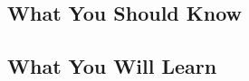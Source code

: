 \subsection{What You Should Know}

\begin{frame}{\myframetitle{}}
	\begin{fancycolumns}
	\nextcolumn
%
	\end{fancycolumns}
\end{frame}

\subsection{What You Will Learn}

\begin{frame}{\myframetitle{}}
	\lectureseriesoverview[1]
\end{frame}

